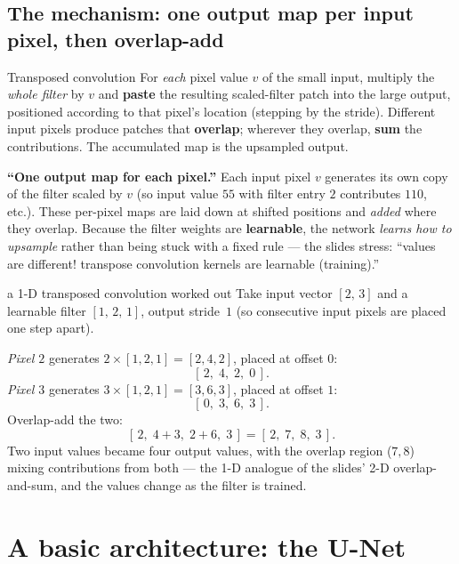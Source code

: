 \documentclass{report}
\begin{document}
\subsection{The mechanism: one output map per input pixel, then overlap-add}

\begin{defbox}{Transposed convolution}
For \emph{each} pixel value $v$ of the small input, multiply the \emph{whole
filter} by $v$ and \textbf{paste} the resulting scaled-filter patch into the
large output, positioned according to that pixel's location (stepping by the
stride). Different input pixels produce patches that \textbf{overlap}; wherever
they overlap, \textbf{sum} the contributions. The accumulated map is the
upsampled output.
\end{defbox}

\begin{keybox}
\textbf{``One output map for each pixel.''} Each input pixel $v$ generates its
own copy of the filter scaled by $v$ (so input value $55$ with filter entry $2$
contributes $110$, etc.). These per-pixel maps are laid down at shifted
positions and \emph{added} where they overlap. Because the filter weights are
\textbf{learnable}, the network \emph{learns how to upsample} rather than being
stuck with a fixed rule --- the slides stress: ``values are different! transpose
convolution kernels are learnable (training).''
\end{keybox}

\begin{exbox}{a 1-D transposed convolution worked out}
Take input vector $[2,\,3]$ and a learnable filter $[1,\,2,\,1]$, output
stride~$1$ (so consecutive input pixels are placed one step apart).

\emph{Pixel $2$} generates $2\times[1,2,1]=[2,4,2]$, placed at offset $0$:
\[
[\,2,\;4,\;2,\;0\,].
\]
\emph{Pixel $3$} generates $3\times[1,2,1]=[3,6,3]$, placed at offset $1$:
\[
[\,0,\;3,\;6,\;3\,].
\]
Overlap-add the two:
\[
[\,2,\;4+3,\;2+6,\;3\,] = [\,2,\;7,\;8,\;3\,].
\]
Two input values became four output values, with the overlap region ($7,8$)
mixing contributions from both --- the 1-D analogue of the slides' 2-D
overlap-and-sum, and the values change as the filter is trained.
\end{exbox}

\section{A basic architecture: the U-Net}
\end{document}

